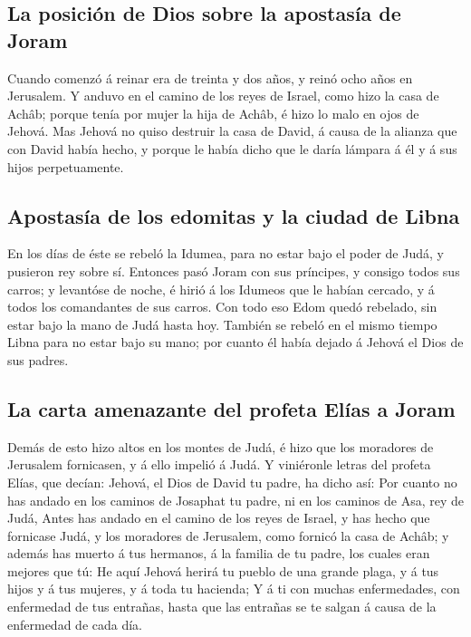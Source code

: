 \hypertarget{la-posiciuxf3n-de-dios-sobre-la-apostasuxeda-de-joram}{%
\subsection{La posición de Dios sobre la apostasía de
Joram}\label{la-posiciuxf3n-de-dios-sobre-la-apostasuxeda-de-joram}}

 Cuando comenzó á reinar era de treinta y dos años, y
reinó ocho años en Jerusalem.  Y anduvo en el camino de
los reyes de Israel, como hizo la casa de Achâb; porque tenía por mujer
la hija de Achâb, é hizo lo malo en ojos de Jehová.  Mas
Jehová no quiso destruir la casa de David, á causa de la alianza que con
David había hecho, y porque le había dicho que le daría lámpara á él y á
sus hijos perpetuamente.

\hypertarget{apostasuxeda-de-los-edomitas-y-la-ciudad-de-libna}{%
\subsection{Apostasía de los edomitas y la ciudad de
Libna}\label{apostasuxeda-de-los-edomitas-y-la-ciudad-de-libna}}

 En los días de éste se rebeló la Idumea, para no estar
bajo el poder de Judá, y pusieron rey sobre sí.  Entonces
pasó Joram con sus príncipes, y consigo todos sus carros; y levantóse de
noche, é hirió á los Idumeos que le habían cercado, y á todos los
comandantes de sus carros.  Con todo eso Edom quedó
rebelado, sin estar bajo la mano de Judá hasta hoy. También se rebeló en
el mismo tiempo Libna para no estar bajo su mano; por cuanto él había
dejado á Jehová el Dios de sus padres.

\hypertarget{la-carta-amenazante-del-profeta-eluxedas-a-joram}{%
\subsection{La carta amenazante del profeta Elías a
Joram}\label{la-carta-amenazante-del-profeta-eluxedas-a-joram}}

 Demás de esto hizo altos en los montes de Judá, é hizo
que los moradores de Jerusalem fornicasen, y á ello impelió á Judá.
 Y viniéronle letras del profeta Elías, que decían:
Jehová, el Dios de David tu padre, ha dicho así: Por cuanto no has
andado en los caminos de Josaphat tu padre, ni en los caminos de Asa,
rey de Judá,  Antes has andado en el camino de los reyes
de Israel, y has hecho que fornicase Judá, y los moradores de Jerusalem,
como fornicó la casa de Achâb; y además has muerto á tus hermanos, á la
familia de tu padre, los cuales eran mejores que tú:  He
aquí Jehová herirá tu pueblo de una grande plaga, y á tus hijos y á tus
mujeres, y á toda tu hacienda;  Y á ti con muchas
enfermedades, con enfermedad de tus entrañas, hasta que las entrañas se
te salgan á causa de la enfermedad de cada día.

